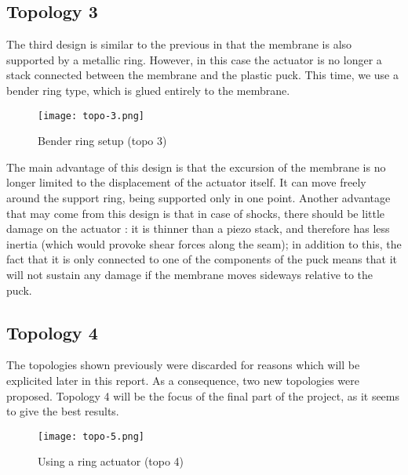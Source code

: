 \subsection{Topology 3}

The third design is similar to the previous in that the membrane is also
supported by a metallic ring. However, in this case the actuator is no longer a
stack connected between the membrane and the plastic puck. This time, we use a
bender ring type, which is glued entirely to the membrane.

\begin{figure}[h]
  \begin{center}
    \texttt{[image: topo-3.png]}
  \end{center}
  \caption{Bender ring setup (topo 3)}
  \label{fig:topo-3}
\end{figure}

The main advantage of this design is that the excursion of the membrane is no
longer limited to the displacement of the actuator itself. It can move freely
around the support ring, being supported only in one point. Another advantage
that may come from this design is that in case of shocks, there should be little
damage on the actuator : it is thinner than a piezo stack, and therefore has
less inertia (which would provoke shear forces along the seam); in addition to
this, the fact that it is only connected to one of the components of the puck
means that it will not sustain any damage if the membrane moves sideways
relative to the puck.


\subsection{Topology 4}

The topologies shown previously were discarded for reasons which will be
explicited later in this report. As a consequence, two new topologies were
proposed. Topology 4 will be the focus of the final part of the project, as it
seems to give the best results.

\begin{figure}[h]
  \begin{center}
    \texttt{[image: topo-5.png]}
  \end{center}
  \caption{Using a ring actuator (topo 4)}
  \label{fig:topo-5}
\end{figure}

